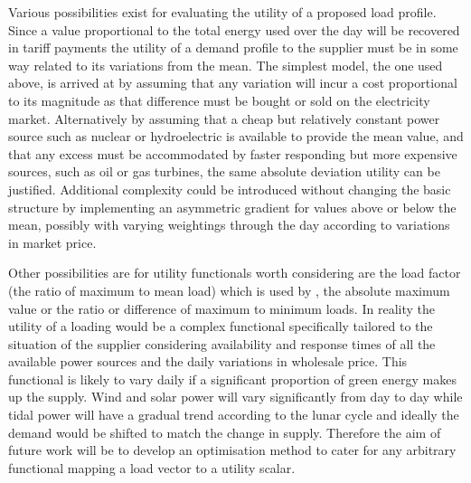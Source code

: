 \documentclass[a4paper, 10 pt, conference]{ieeeconf}  %
\begin{document}
Various possibilities exist for evaluating the utility of a proposed load profile. Since a value proportional to the total energy used over the day will be recovered in tariff payments the utility of a demand profile to the supplier must be in some way related to its variations from the mean. The simplest model, the one used above, is arrived at by assuming that any variation will incur a cost proportional to its magnitude as that difference must be bought or sold on the electricity market. Alternatively by assuming that a cheap but relatively constant power source such as nuclear or hydroelectric is available to provide the mean value, and that any excess must be accommodated by faster responding but more expensive sources, such as oil or gas turbines, the same absolute deviation utility can be justified. Additional complexity could be introduced without changing the basic structure by implementing an asymmetric gradient for values above or below the mean, possibly with varying weightings through the day according to variations in market price.

Other possibilities are for utility functionals worth considering are the load factor (the ratio of maximum to mean load) which is used by \cite{ramchurn2011agent}, the absolute maximum value or the ratio or difference of maximum to minimum loads. In reality the utility of a loading would be a complex functional specifically tailored to the situation of the supplier considering availability and response times of all the available power sources and the daily variations in wholesale price. This functional is likely to vary daily if a significant proportion of green energy makes up the supply. Wind and solar power will vary significantly from day to day while tidal power will have a gradual trend according to the lunar cycle and ideally the demand would be shifted to match the change in supply. Therefore the aim of future work will be to develop an optimisation method to cater for any arbitrary functional mapping a load vector to a utility scalar.

\end{document}

